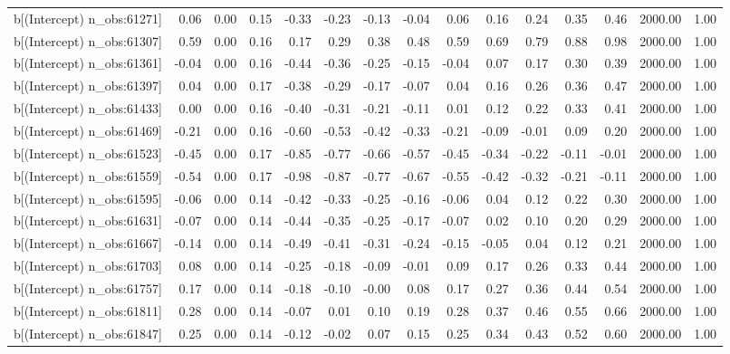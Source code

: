 \begin{table}[ht]
\begin{tabular}{rrrrrrrrrrrrrrr}
  b[(Intercept) n\_obs:61271] & 0.06 & 0.00 & 0.15 & -0.33 & -0.23 & -0.13 & -0.04 & 0.06 & 0.16 & 0.24 & 0.35 & 0.46 & 2000.00 & 1.00 \\ 
  b[(Intercept) n\_obs:61307] & 0.59 & 0.00 & 0.16 & 0.17 & 0.29 & 0.38 & 0.48 & 0.59 & 0.69 & 0.79 & 0.88 & 0.98 & 2000.00 & 1.00 \\ 
  b[(Intercept) n\_obs:61361] & -0.04 & 0.00 & 0.16 & -0.44 & -0.36 & -0.25 & -0.15 & -0.04 & 0.07 & 0.17 & 0.30 & 0.39 & 2000.00 & 1.00 \\ 
  b[(Intercept) n\_obs:61397] & 0.04 & 0.00 & 0.17 & -0.38 & -0.29 & -0.17 & -0.07 & 0.04 & 0.16 & 0.26 & 0.36 & 0.47 & 2000.00 & 1.00 \\ 
  b[(Intercept) n\_obs:61433] & 0.00 & 0.00 & 0.16 & -0.40 & -0.31 & -0.21 & -0.11 & 0.01 & 0.12 & 0.22 & 0.33 & 0.41 & 2000.00 & 1.00 \\ 
  b[(Intercept) n\_obs:61469] & -0.21 & 0.00 & 0.16 & -0.60 & -0.53 & -0.42 & -0.33 & -0.21 & -0.09 & -0.01 & 0.09 & 0.20 & 2000.00 & 1.00 \\ 
  b[(Intercept) n\_obs:61523] & -0.45 & 0.00 & 0.17 & -0.85 & -0.77 & -0.66 & -0.57 & -0.45 & -0.34 & -0.22 & -0.11 & -0.01 & 2000.00 & 1.00 \\ 
  b[(Intercept) n\_obs:61559] & -0.54 & 0.00 & 0.17 & -0.98 & -0.87 & -0.77 & -0.67 & -0.55 & -0.42 & -0.32 & -0.21 & -0.11 & 2000.00 & 1.00 \\ 
  b[(Intercept) n\_obs:61595] & -0.06 & 0.00 & 0.14 & -0.42 & -0.33 & -0.25 & -0.16 & -0.06 & 0.04 & 0.12 & 0.22 & 0.30 & 2000.00 & 1.00 \\ 
  b[(Intercept) n\_obs:61631] & -0.07 & 0.00 & 0.14 & -0.44 & -0.35 & -0.25 & -0.17 & -0.07 & 0.02 & 0.10 & 0.20 & 0.29 & 2000.00 & 1.00 \\ 
  b[(Intercept) n\_obs:61667] & -0.14 & 0.00 & 0.14 & -0.49 & -0.41 & -0.31 & -0.24 & -0.15 & -0.05 & 0.04 & 0.12 & 0.21 & 2000.00 & 1.00 \\ 
  b[(Intercept) n\_obs:61703] & 0.08 & 0.00 & 0.14 & -0.25 & -0.18 & -0.09 & -0.01 & 0.09 & 0.17 & 0.26 & 0.33 & 0.44 & 2000.00 & 1.00 \\ 
  b[(Intercept) n\_obs:61757] & 0.17 & 0.00 & 0.14 & -0.18 & -0.10 & -0.00 & 0.08 & 0.17 & 0.27 & 0.36 & 0.44 & 0.54 & 2000.00 & 1.00 \\ 
  b[(Intercept) n\_obs:61811] & 0.28 & 0.00 & 0.14 & -0.07 & 0.01 & 0.10 & 0.19 & 0.28 & 0.37 & 0.46 & 0.55 & 0.66 & 2000.00 & 1.00 \\ 
  b[(Intercept) n\_obs:61847] & 0.25 & 0.00 & 0.14 & -0.12 & -0.02 & 0.07 & 0.15 & 0.25 & 0.34 & 0.43 & 0.52 & 0.60 & 2000.00 & 1.00 \\ 

\end{tabular}
\end{table}
